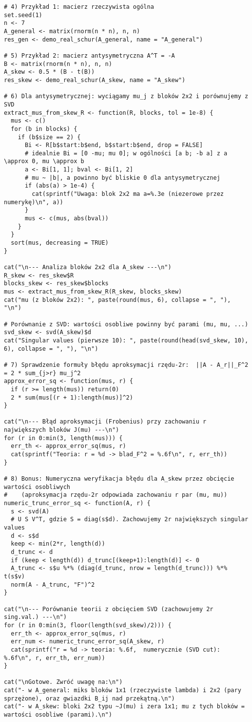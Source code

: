 \documentclass[12pt]{article}
\theoremstyle{plain}
\theoremstyle{remark}
\begin{document}
\begin{verbatim}
# 4) Przykład 1: macierz rzeczywista ogólna
set.seed(1)
n <- 7
A_general <- matrix(rnorm(n * n), n, n)
res_gen <- demo_real_schur(A_general, name = "A_general")

# 5) Przykład 2: macierz antysymetryczna A^T = -A
B <- matrix(rnorm(n * n), n, n)
A_skew <- 0.5 * (B - t(B))
res_skew <- demo_real_schur(A_skew, name = "A_skew")

# 6) Dla antysymetrycznej: wyciągamy mu_j z bloków 2x2 i porównujemy z SVD
extract_mus_from_skew_R <- function(R, blocks, tol = 1e-8) {
  mus <- c()
  for (b in blocks) {
    if (b$size == 2) {
      Bi <- R[b$start:b$end, b$start:b$end, drop = FALSE]
      # idealnie Bi = [0 -mu; mu 0]; w ogólności [a b; -b a] z a \approx 0, mu \approx b
      a <- Bi[1, 1]; bval <- Bi[1, 2]
      # mu ~ |b|, a powinno być bliskie 0 dla antysymetrycznej
      if (abs(a) > 1e-4) {
        cat(sprintf("Uwaga: blok 2x2 ma a=%.3e (niezerowe przez numerykę)\n", a))
      }
      mus <- c(mus, abs(bval))
    }
  }
  sort(mus, decreasing = TRUE)
}

cat("\n--- Analiza bloków 2x2 dla A_skew ---\n")
R_skew <- res_skew$R
blocks_skew <- res_skew$blocks
mus <- extract_mus_from_skew_R(R_skew, blocks_skew)
cat("mu (z bloków 2x2): ", paste(round(mus, 6), collapse = ", "), "\n")

# Porównanie z SVD: wartości osobliwe powinny być parami (mu, mu, ...)
svd_skew <- svd(A_skew)$d
cat("Singular values (pierwsze 10): ", paste(round(head(svd_skew, 10), 6), collapse = ", "), "\n")

# 7) Sprawdzenie formuły błędu aproksymacji rzędu-2r:  ||A - A_r||_F^2 = 2 * sum_{j>r} mu_j^2
approx_error_sq <- function(mus, r) {
  if (r >= length(mus)) return(0)
  2 * sum(mus[(r + 1):length(mus)]^2)
}

cat("\n--- Błąd aproksymacji (Frobenius) przy zachowaniu r największych bloków J(mu) ---\n")
for (r in 0:min(3, length(mus))) {
  err_th <- approx_error_sq(mus, r)
  cat(sprintf("Teoria: r = %d -> blad_F^2 = %.6f\n", r, err_th))
}

# 8) Bonus: Numeryczna weryfikacja błędu dla A_skew przez obcięcie wartości osobliwych
#    (aproksymacja rzędu-2r odpowiada zachowaniu r par (mu, mu))
numeric_trunc_error_sq <- function(A, r) {
  s <- svd(A)
  # U S V^T, gdzie S = diag(s$d). Zachowujemy 2r największych singular values
  d <- s$d
  keep <- min(2*r, length(d))
  d_trunc <- d
  if (keep < length(d)) d_trunc[(keep+1):length(d)] <- 0
  A_trunc <- s$u %*% (diag(d_trunc, nrow = length(d_trunc))) %*% t(s$v)
  norm(A - A_trunc, "F")^2
}

cat("\n--- Porównanie teorii z obcięciem SVD (zachowujemy 2r sing.val.) ---\n")
for (r in 0:min(3, floor(length(svd_skew)/2))) {
  err_th <- approx_error_sq(mus, r)
  err_num <- numeric_trunc_error_sq(A_skew, r)
  cat(sprintf("r = %d -> teoria: %.6f,  numerycznie (SVD cut): %.6f\n", r, err_th, err_num))
}

cat("\nGotowe. Zwróć uwagę na:\n")
cat("- w A_general: miks bloków 1x1 (rzeczywiste lambda) i 2x2 (pary sprzężone), oraz gwiazdki B_ij nad przekątną.\n")
cat("- w A_skew: bloki 2x2 typu ~J(mu) i zera 1x1; mu z tych bloków = wartości osobliwe (parami).\n")

\end{verbatim}
\end{document}
